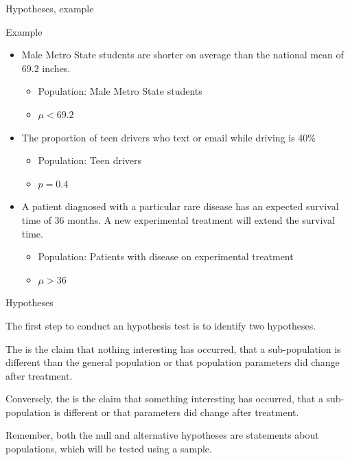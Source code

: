 \documentclass[xcolor=table, aspectratio=169, bigger, handout]{beamer}
\begin{document}
\begin{frame}{Hypotheses, example}
\begin{exampleblock}{Example}
\begin{itemize}
\item Male Metro State students are shorter on average than the national mean of 69.2 inches.
\begin{itemize}
\pause\item Population: Male Metro State students
\pause\item $\mu < 69.2$
\end{itemize}

\pause\item The proportion of teen drivers who text or email while driving is 40\%
\begin{itemize}
\pause\item Population: Teen drivers
\pause\item $p = 0.4$
\end{itemize}

\pause\item A patient diagnosed with a particular rare disease has an expected survival time of 36 months. A new experimental treatment will extend the survival time.
\begin{itemize}
\pause\item Population: Patients with disease on experimental treatment
\pause\item $\mu > 36$
\end{itemize}
\end{itemize}
\end{exampleblock}
\end{frame}

\begin{frame}{Hypotheses}
\begin{block}{}
The first step to conduct an hypothesis test is to identify two hypotheses.
\end{block}
\pause
\begin{block}{}
The  is the claim that nothing interesting has occurred, that a sub-population is  different than the general population or that population parameters did  change after treatment.
\end{block}
\pause
\begin{block}{} 
Conversely, the  is the claim that something interesting has occurred, that a sub-population is different or that parameters did change after treatment.
\end{block}
\pause
\begin{block}{}
Remember, both the null and alternative hypotheses are statements about populations, which will be tested using a sample.
\end{block}
\end{frame}
\end{document}
